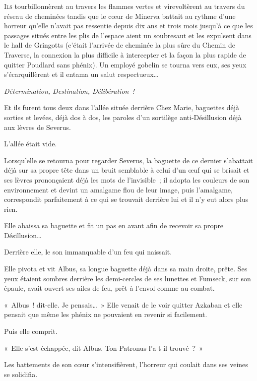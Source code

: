 
\lettrine{I}{ls} tourbillonnèrent au travers les flammes vertes et virevoltèrent au travers du réseau de cheminées tandis que le cœur de Minerva battait au rythme d'une horreur qu'elle n'avait pas ressentie depuis dix ans et trois mois jusqu'à ce que les passages situés entre les plis de l'espace aient un soubresaut et les expulsent dans le hall de Gringotts (c'était l'arrivée de cheminée la plus sûre du Chemin de Traverse, la connexion la plus difficile à intercepter et la façon la plus rapide de quitter Poudlard sans phénix). Un employé gobelin se tourna vers eux, ses yeux s'écarquillèrent et il entama un salut respectueux…

\emph{Détermination, Destination, Délibération~!}

Et ils furent tous deux dans l'allée située derrière Chez Marie, baguettes déjà sorties et levées, déjà dos à dos, les paroles d'un sortilège anti-Désillusion déjà aux lèvres de Severus.

L'allée était vide.

Lorsqu'elle se retourna pour regarder Severus, la baguette de ce dernier s'abattait déjà sur sa propre tête dans un bruit semblable à celui d'un œuf qui se brisait et ses lèvres prononçaient déjà les mots de l'invisible~; il adopta les couleurs de son environnement et devint un amalgame flou de leur image, puis l'amalgame, correspondit parfaitement à ce qui se trouvait derrière lui et il n'y eut alors plus rien.

Elle abaissa sa baguette et fit un pas en avant afin de recevoir sa propre Désillusion…

Derrière elle, le son immanquable d'un feu qui naissait.

Elle pivota et vit Albus, sa longue baguette déjà dans sa main droite, prête. Ses yeux étaient sombres derrière les demi-cercles de ses lunettes et Fumseck, sur son épaule, avait ouvert ses ailes de feu, prêt à l'envol comme au combat.

«~Albus~! dit-elle. Je pensais…~» Elle venait de le voir quitter Azkaban et elle pensait que même les phénix ne pouvaient en revenir si facilement.

Puis elle comprit.

«~Elle s'est échappée, dit Albus. Ton Patronus l'a-t-il trouvé~?~»

Les battements de son cœur s'intensifièrent, l'horreur qui coulait dans ses veines se solidifia.

